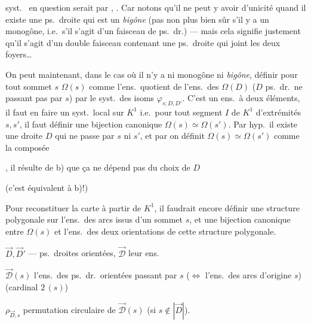 \documentclass[11pt,a4paper]{article}
\begin{document}
syst.\  en question serait  par \ill{} \ill{}, \ill{}. Car notons qu'il ne peut y avoir d'unicité quand il existe une ps.\ droite qui est un \emph{bigône} (pas non plus bien sûr s'il y a un monogône, i.e.\ s'il s'agit d'un faisceau de ps.\ dr.) --- mais cela signifie justement qu'il s'agit d'un double faisceau contenant une ps.\ droite qui joint les deux foyers\ldots

On peut maintenant, dans le cas où il n'y a ni monogône ni \emph{bigône}, définir pour tout sommet $s$ $\Omega(s)$ comme l'ens.\ quotient de l'ens.\ des $\Omega(D)$ ($D$ ps.\ dr.\ ne passant pas par $s$) par le syst.\ des isoms $\varphi_{s;D,D'}$. C'est un ens.\ à deux éléments, \struck{\ill{}} \ill{} \ill{} il faut en faire un syst.\ local sur $K^{1}$ i.e.\ pour tout segment $I$ de $K^{1}$ d'extrémités $s, s'$, il faut définir une bijection canonique $\Omega(s) \simeq \Omega(s')$. Par hyp.\ il existe une droite $D$ qui ne passe par $s$ ni $s'$, et par  on définit $\Omega(s) \simeq \Omega(s')$ comme la composée


, il résulte de b) que ça ne dépend pas du choix de $D$

(c'est équivalent à b)!)

Pour  reconstituer la carte à partir de $K^{1}$, il faudrait encore définir une structure polygonale sur l'ens.\ des arcs issus d'un sommet $s$, et une bijection canonique entre $\Omega(s)$ et l'ens.\ des deux orientations de cette structure polygonale.

$\vec{D}, \vec{D}'$ --- ps.\ droites orientées, $\vec{\mathcal{D}}$ leur ens.

$\vec{\mathcal{D}}(s)$ l'ens.\ des ps.\ dr.\ orientées passant par $s$ ($\Longleftrightarrow$ l'ens.\ des arcs d'origine $s$) (cardinal $2$\,\uncertain{$\nu$}$(s)$)

$\rho_{\vec{D},s}$ permutation circulaire de $\vec{\mathcal{D}}(s)$ (si $s \notin |\vec{D}|$).
\end{document}
